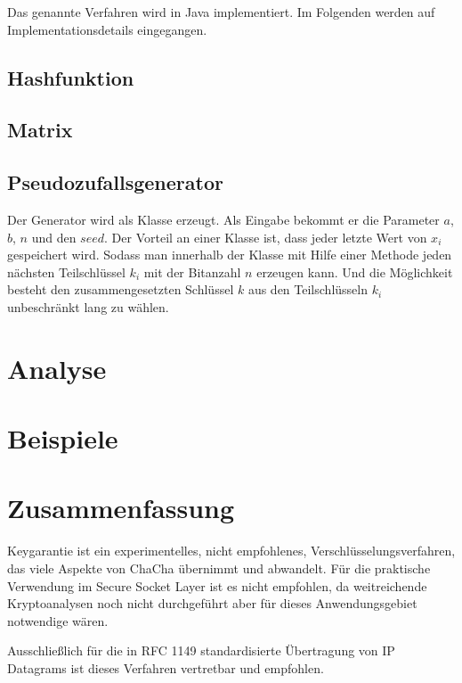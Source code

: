 \documentclass[10pt,a4paper]{article}
\begin{document}
Das genannte Verfahren wird in Java implementiert.
Im Folgenden werden auf Implementationsdetails eingegangen.

\subsection{Hashfunktion}

\subsection{Matrix}

\subsection{Pseudozufallsgenerator}

Der Generator wird als Klasse erzeugt.
Als Eingabe bekommt er die Parameter $a$, $b$, $n$ und
den $seed$.
Der Vorteil an einer Klasse ist, dass jeder letzte Wert von $x_i$ gespeichert wird.
Sodass
man innerhalb der Klasse mit Hilfe einer Methode jeden nächsten Teilschlüssel $k_i$ mit der
Bitanzahl $n$ erzeugen kann.
Und die Möglichkeit besteht den zusammengesetzten Schlüssel $k$
aus den Teilschlüsseln $k_i$ unbeschränkt lang zu wählen.

\section{Analyse}

\section{Beispiele}

\section{Zusammenfassung}

Keygarantie ist ein experimentelles, nicht empfohlenes, Verschlüsselungsverfahren, das viele Aspekte von ChaCha übernimmt und abwandelt.
Für die praktische Verwendung im Secure Socket Layer ist es nicht empfohlen, da weitreichende Kryptoanalysen noch nicht durchgeführt aber für dieses Anwendungsgebiet notwendige wären.

Ausschließlich für die in RFC 1149 standardisierte Übertragung von IP Datagrams\cite{Waitzman1990} ist dieses Verfahren vertretbar und empfohlen.

{}

\end{document}
